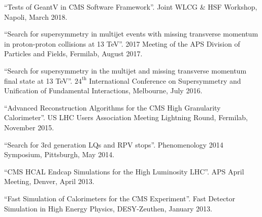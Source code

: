 \begin{description}[leftmargin=12pt,font=\normalfont,labelsep=0em]
\item ``Tests of GeantV in CMS Software Framework''. Joint WLCG \& HSF Workshop, Napoli, March 2018.
\item ``Search for supersymmetry in multijet events with missing transverse momentum in proton-proton collisions at 13 TeV''. 2017 Meeting of the APS Division of Particles and Fields, Fermilab, August 2017.
\item ``Search for supersymmetry in the multijet and missing transverse momentum final state at 13 TeV''. $24^{\text{th}}$ International Conference on Supersymmetry and Unification of Fundamental Interactions, Melbourne, July 2016.
\item ``Advanced Reconstruction Algorithms for the CMS High Granularity Calorimeter''. US LHC Users Association Meeting Lightning Round, Fermilab, November 2015.
\item ``Search for 3rd generation LQs and RPV stops''. Phenomenology 2014 Symposium, Pittsburgh, May 2014.
\item ``CMS HCAL Endcap Simulations for the High Luminosity LHC''. APS April Meeting, Denver, April 2013.
\item ``Fast Simulation of Calorimeters for the CMS Experiment''. Fast Detector Simulation in High Energy Physics, DESY-Zeuthen, January 2013.
\end{description}

